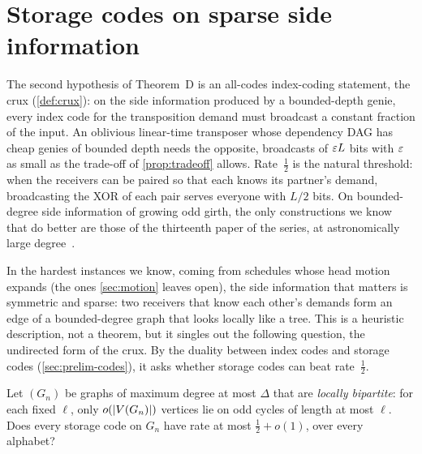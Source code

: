 \section{Storage codes on sparse side information}\label{sec:codes}

The second hypothesis of Theorem~D is an all-codes index-coding statement, the crux (\cref{def:crux}): on the side information
produced by a bounded-depth genie, every index code for the transposition demand must broadcast a constant fraction of
the input. An oblivious linear-time transposer whose dependency DAG has cheap genies of bounded depth needs the
opposite, broadcasts of $\varepsilon L$ bits with $\varepsilon$ as small as the trade-off of \cref{prop:tradeoff} allows. Rate~$\tfrac12$ is the natural threshold: when the receivers can be paired so
that each knows its partner's demand, broadcasting the XOR of each pair serves everyone with $L/2$ bits. On
bounded-degree side information of growing odd girth, the only constructions we know that do better are those of the
thirteenth paper of the series, at astronomically large degree~\cite[Corollary~U]{StorageCodes2026}.

In the hardest instances we know, coming from schedules whose head motion expands (the ones \cref{sec:motion} leaves
open), the side information that matters is symmetric and sparse: two receivers that know each other's demands form an
edge of a bounded-degree graph that looks locally like a tree. This is a heuristic description, not a theorem, but it
singles out the following question, the undirected form of the crux. By the duality between index codes and storage codes
(\cref{sec:prelim-codes}), it asks whether storage codes can beat rate~$\tfrac12$.

\begin{question}\label{prob:undirected-crux}
Let $(G_n)$ be graphs of maximum degree at most $\Delta$ that are \emph{locally bipartite}: for each fixed $\ell$, only
$o(\lvert V(G_n) \rvert)$ vertices lie on odd cycles of length at most $\ell$. Does every storage code on $G_n$ have rate at most
$\tfrac12+o(1)$, over every alphabet?
\end{question}

